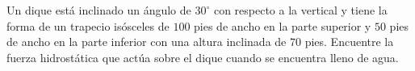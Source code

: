 \item Un dique está inclinado un ángulo de $30^\circ$ con respecto a la vertical y tiene la forma de un trapecio isósceles de $100$ pies de ancho en la parte superior y $50$ pies de ancho en la parte inferior con una altura inclinada de $70$ pies. Encuentre la fuerza hidrostática que actúa sobre el dique cuando se encuentra lleno de agua.
